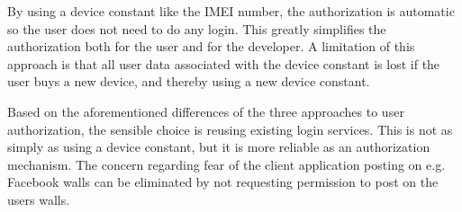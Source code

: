 By using a device constant like the IMEI number, the authorization is automatic so the user does not need to do any login. This greatly simplifies the authorization both for the user and for the developer. A limitation of this approach is that all user data associated with the device constant is lost if the user buys a new device, and thereby using a new device constant.

Based on the aforementioned differences of the three approaches to user authorization, the sensible choice is reusing existing login services. This is not as simply as using a device constant, but it is more reliable as an authorization mechanism. The concern regarding fear of the client application posting on e.g. Facebook walls can be eliminated by not requesting permission to post on the users walls.
